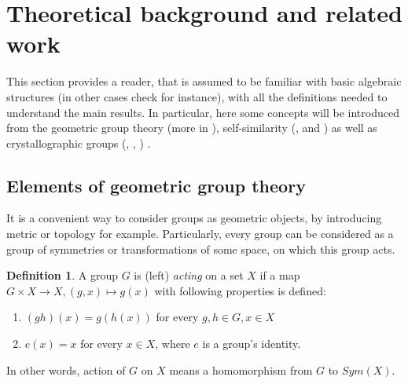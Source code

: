 \documentclass[a4paper,12pt]{amsart}
\theoremstyle{definition}
\newtheorem{definition}{Definition}
\begin{document}
		
	
	
	\newpage 
	\section{Theoretical background and related work}\label{section: theory}
	This section provides a reader, that is assumed to be familiar with basic algebraic structures (in other cases check \cite{Algebra} for instance), with all the definitions needed to understand the main results. In particular, here some concepts will be introduced from the  geometric group theory (more in \cite{GeomAlgebra:Bondarenko}), self-similarity (\cite{Nekrashevych:self-similar}, \cite{Nekrashevych:virtual_endomorphisms} and \cite{Auto}) as well as crystallographic groups (\cite{Cryst_and_math}, \cite{cryst:group_theory}, \cite{cryst:geometry_of_cryst}) .
	
	\subsection{Elements of geometric group theory}
	It is a convenient way to consider groups as geometric objects, by introducing metric or topology for example. Particularly, every group can be considered as a group of symmetries or transformations of some space, on which this group acts. 
	
	\begin{definition}
		A group $G$ is (left) \textit{acting} on a set $X$ if a map $G \times X \rightarrow X, (g, x) \mapsto g(x)$ with following properties is defined: 
		
		\begin{enumerate}[label=\arabic*.]
			\item $(gh)(x) = g(h(x))$ for every $g, h \in G, x \in X$
			\item $e(x) = x$ for every $x \in X$, where $e$ is a group's identity.
			
		\end{enumerate}
		
	\end{definition}
	
	
	In other words, action of $G$ on $X$ means a homomorphism from $G$ to $Sym(X)$. 
\end{document}
